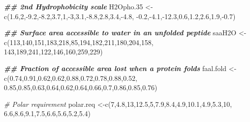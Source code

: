 \documentclass[
]{book}
\newenvironment{Shaded}{\begin{snugshade}}{\end{snugshade}}
\newcommand{\CommentTok}[1]{\textcolor[rgb]{0.56,0.35,0.01}{\textit{#1}}}
\newcommand{\DecValTok}[1]{\textcolor[rgb]{0.00,0.00,0.81}{#1}}
\newcommand{\DocumentationTok}[1]{\textcolor[rgb]{0.56,0.35,0.01}{\textbf{\textit{#1}}}}
\newcommand{\FloatTok}[1]{\textcolor[rgb]{0.00,0.00,0.81}{#1}}
\newcommand{\FunctionTok}[1]{\textcolor[rgb]{0.00,0.00,0.00}{#1}}
\newcommand{\NormalTok}[1]{#1}
\newcommand{\OtherTok}[1]{\textcolor[rgb]{0.56,0.35,0.01}{#1}}
\newcommand{\SpecialCharTok}[1]{\textcolor[rgb]{0.00,0.00,0.00}{#1}}
\begin{document}
\begin{Shaded}
\begin{Highlighting}[]
\DocumentationTok{\#\# 2nd Hydrophobicity scale}
\NormalTok{H2Opho}\FloatTok{.35} \OtherTok{\textless{}{-}}\FunctionTok{c}\NormalTok{(}\FloatTok{1.6}\NormalTok{,}\DecValTok{2}\NormalTok{,}\SpecialCharTok{{-}}\FloatTok{9.2}\NormalTok{,}\SpecialCharTok{{-}}\FloatTok{8.2}\NormalTok{,}\FloatTok{3.7}\NormalTok{,}\DecValTok{1}\NormalTok{,}\SpecialCharTok{{-}}\DecValTok{3}\NormalTok{,}\FloatTok{3.1}\NormalTok{,}\SpecialCharTok{{-}}\FloatTok{8.8}\NormalTok{,}\FloatTok{2.8}\NormalTok{,}\FloatTok{3.4}\NormalTok{,}\SpecialCharTok{{-}}\FloatTok{4.8}\NormalTok{,}
                  \SpecialCharTok{{-}}\FloatTok{0.2}\NormalTok{,}\SpecialCharTok{{-}}\FloatTok{4.1}\NormalTok{,}\SpecialCharTok{{-}}\FloatTok{12.3}\NormalTok{,}\FloatTok{0.6}\NormalTok{,}\FloatTok{1.2}\NormalTok{,}\FloatTok{2.6}\NormalTok{,}\FloatTok{1.9}\NormalTok{,}\SpecialCharTok{{-}}\FloatTok{0.7}\NormalTok{)}

\DocumentationTok{\#\# Surface area accessible to water in an unfolded peptide}
\NormalTok{saaH2O       }\OtherTok{\textless{}{-}}\FunctionTok{c}\NormalTok{(}\DecValTok{113}\NormalTok{,}\DecValTok{140}\NormalTok{,}\DecValTok{151}\NormalTok{,}\DecValTok{183}\NormalTok{,}\DecValTok{218}\NormalTok{,}\DecValTok{85}\NormalTok{,}\DecValTok{194}\NormalTok{,}\DecValTok{182}\NormalTok{,}\DecValTok{211}\NormalTok{,}\DecValTok{180}\NormalTok{,}\DecValTok{204}\NormalTok{,}\DecValTok{158}\NormalTok{,}
                 \DecValTok{143}\NormalTok{,}\DecValTok{189}\NormalTok{,}\DecValTok{241}\NormalTok{,}\DecValTok{122}\NormalTok{,}\DecValTok{146}\NormalTok{,}\DecValTok{160}\NormalTok{,}\DecValTok{259}\NormalTok{,}\DecValTok{229}\NormalTok{)}


\DocumentationTok{\#\# Fraction of accessible area lost when a protein folds}
\NormalTok{faal.fold    }\OtherTok{\textless{}{-}}\FunctionTok{c}\NormalTok{(}\FloatTok{0.74}\NormalTok{,}\FloatTok{0.91}\NormalTok{,}\FloatTok{0.62}\NormalTok{,}\FloatTok{0.62}\NormalTok{,}\FloatTok{0.88}\NormalTok{,}\FloatTok{0.72}\NormalTok{,}\FloatTok{0.78}\NormalTok{,}\FloatTok{0.88}\NormalTok{,}\FloatTok{0.52}\NormalTok{,}
                 \FloatTok{0.85}\NormalTok{,}\FloatTok{0.85}\NormalTok{,}\FloatTok{0.63}\NormalTok{,}\FloatTok{0.64}\NormalTok{,}\FloatTok{0.62}\NormalTok{,}\FloatTok{0.64}\NormalTok{,}\FloatTok{0.66}\NormalTok{,}\FloatTok{0.7}\NormalTok{,}\FloatTok{0.86}\NormalTok{,}\FloatTok{0.85}\NormalTok{,}\FloatTok{0.76}\NormalTok{)}



\CommentTok{\# Polar requirement }
\NormalTok{polar.req    }\OtherTok{\textless{}{-}}\FunctionTok{c}\NormalTok{(}\DecValTok{7}\NormalTok{,}\FloatTok{4.8}\NormalTok{,}\DecValTok{13}\NormalTok{,}\FloatTok{12.5}\NormalTok{,}\DecValTok{5}\NormalTok{,}\FloatTok{7.9}\NormalTok{,}\FloatTok{8.4}\NormalTok{,}\FloatTok{4.9}\NormalTok{,}\FloatTok{10.1}\NormalTok{,}\FloatTok{4.9}\NormalTok{,}\FloatTok{5.3}\NormalTok{,}\DecValTok{10}\NormalTok{,}
                 \FloatTok{6.6}\NormalTok{,}\FloatTok{8.6}\NormalTok{,}\FloatTok{9.1}\NormalTok{,}\FloatTok{7.5}\NormalTok{,}\FloatTok{6.6}\NormalTok{,}\FloatTok{5.6}\NormalTok{,}\FloatTok{5.2}\NormalTok{,}\FloatTok{5.4}\NormalTok{)}


\end{Highlighting}
\end{Shaded}
\end{document}
